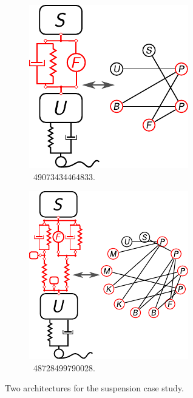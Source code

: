 \begin{figure}
\centering
\begin{subfigure}[b]{0.3\columnwidth}
\centering
\includegraphics[width=\columnwidth]{../ch2/figures/suspension3_1}
\caption{\mypm{}~49073434464833.\label{fig:ch2:suspension3_1}}
\end{subfigure}
\begin{subfigure}[b]{0.35\columnwidth}
\centering
\includegraphics[width=\columnwidth]{../ch2/figures/suspension3_2}
\caption{\mypm{}~48728499790028.\label{fig:ch2:suspension3_2}}
\end{subfigure}
\caption{Two architectures for the suspension case study.\label{fig:ch2:suspension3}}
\end{figure}